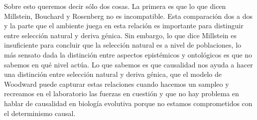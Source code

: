 Sobre esto queremos decir sólo dos cosas. La primera es que lo que dicen Millstein, Bouchard y Rosenberg no es incompatible. Esta comparación dos a dos y la parte que el ambiente juega en esta relación es importante para distinguir entre selección natural y deriva génica. Sin embargo, lo que dice Millstein es insuficiente para concluir que la selección natural es a nivel de poblaciones, lo más sensato dada la distinción entre aspectos epistémicos y ontológicos es que no sabemos en qué nivel actúa. Lo que sabemos es que causalidad nos ayuda a hacer una distinción entre selección natural y deriva génica, que el modelo de Woodward puede capturar estas relaciones cuando hacemos un sampleo y recreamos en el laboratorio las fuerzas en cuestión y que no hay problema en hablar de causalidad en biología evolutiva porque no estamos comprometidos con el determinismo causal.


